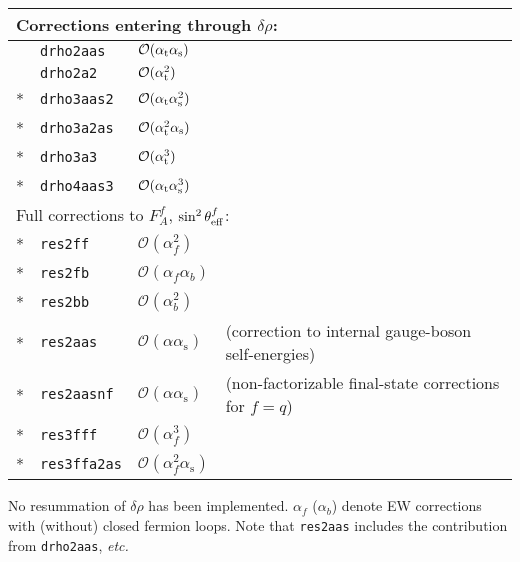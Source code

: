 \documentclass[12pt]{article}
\def\mathswitchr#1{\relax\ifmmode{\mathrm{#1}}\else$\mathrm{#1}$\fi}
\newcommand{\Pt}{\mathswitchr t}
\newcommand{\as}{\alpha_{\mathrm s}}
\newcommand{\at}{\alpha_\Pt}
\newcommand{\seff}[1]{\sin^2\theta_{\rm eff}^{#1}}
\newcommand{\OO}{{\mathcal O}}
\begin{document}
\medskip\noindent
\renewcommand{\arraystretch}{1.1}
\begin{tabular}{llll}
\hline
\multicolumn{4}{l}{Corrections entering through $\delta\rho$:} \\
\hline
& \texttt{drho2aas} & $\OO{(\at\as)}$ & \cite{Djouadi:1987gn,Djouadi:1987di} \\
& \texttt{drho2a2} & $\OO{(\at^2)}$ & \cite{vanderBij:1986hy,Barbieri:1992nz,Barbieri:1992dq,Fleischer:1993ub,Fleischer:1994cb} \\
* & \texttt{drho3aas2} & $\OO{(\at\as^2)}$ & \cite{Avdeev:1994db, Chetyrkin:1995ix} \\
* & \texttt{drho3a2as} & $\OO{(\at^2\as)}$ & \cite{vanderBij:2000cg,Faisst:2003px} \\
* & \texttt{drho3a3} & $\OO{(\at^3)}$ & \cite{vanderBij:2000cg,Faisst:2003px} \\
* & \texttt{drho4aas3} & $\OO{(\at\as^3)}$ & \cite{Schroder:2005db,Chetyrkin:2006bj,Boughezal:2006xk} \\
\hline\hline
\multicolumn{4}{l}{Full corrections to $F_A^f$, $\seff{f}$:} \\
\hline
* & \texttt{res2ff} & $\OO{(\alpha_f^2)}$ & \cite{Awramik:2004ge,Hollik:2005va,Freitas:2014hra} \\
* & \texttt{res2fb} & $\OO{(\alpha_f\alpha_b)}$ & \cite{Awramik:2004ge,Hollik:2005va,Awramik:2008gi,Freitas:2014hra} \\
* & \texttt{res2bb} & $\OO{(\alpha_b^2)}$ & \cite{Awramik:2006ar,Hollik:2006ma,Dubovyk:2016aqv,Dubovyk:2018rlg,Dubovyk:2019szj} \\
* & \texttt{res2aas} & $\OO{(\alpha\as)}$ & \cite{Kniehl:1989yc,Kniehl:1991gu,Djouadi:1993ss} (correction to internal gauge-boson self-energies) \\
* & \texttt{res2aasnf} & $\OO{(\alpha\as)}$ & \cite{Czarnecki:1996ei,Harlander:1997zb,Fleischer:1992fq,Buchalla:1992zm,Degrassi:1993ij,Chetyrkin:1993jp} (non-factorizable final-state corrections for $f=q$) \\
* & \texttt{res3fff} & $\OO{(\alpha_f^3)}$ & \cite{Chen:2020xzx} \\
* & \texttt{res3ffa2as} & $\OO{(\alpha_f^2\as)}$ & \cite{Chen:2020xot} \\
\hline
\end{tabular}

\medskip\noindent
No resummation of $\delta\rho$ has been implemented.
$\alpha_f$ ($\alpha_b$) denote EW corrections with (without) closed fermion loops.
Note that \texttt{res2aas} includes the contribution from \texttt{drho2aas}, \emph{etc.}
\end{document}
